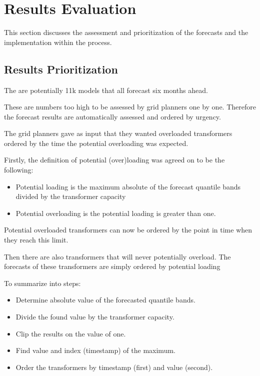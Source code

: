 \documentclass[letterpaper,10pt,english]{sphinxmanual}
\begin{document}
\section{Results Evaluation}
\label{\detokenize{evaluation:results-evaluation}}
This section discusses the assessment and prioritization of the forecasts and the implementation within the process.


\subsection{Results Prioritization}
\label{\detokenize{evaluation:results-prioritization}}
The are potentially 11k models that all forecast six months ahead.

These are numbers too high to be assessed by grid planners one by one.
Therefore the forecast results are automatically assessed and ordered by urgency.

The grid planners gave as input that they wanted overloaded transformers ordered by the time the potential overloading was expected.

Firstly, the definition of potential (over)loading was agreed on to be the following:
\begin{itemize}
\item {} 
Potential loading is the maximum absolute of the forecast quantile bands divided by the transformer capacity

\item {} 
Potential overloading is the potential loading is greater than one.

\end{itemize}

Potential overloaded transformers can now be ordered by the point in time when they reach this limit.

Then there are also transformers that will never potentially overload.
The forecasts of these transformers are simply ordered by potential loading

To summarize into steps:
\begin{itemize}
\item {} 
Determine absolute value of the forecasted quantile bands.

\item {} 
Divide the found value by the transformer capacity.

\item {} 
Clip the results on the value of one.

\item {} 
Find value and index (timestamp) of the maximum.

\item {} 
Order the transformers by timestamp (first) and value (second).

\end{itemize}
\end{document}

